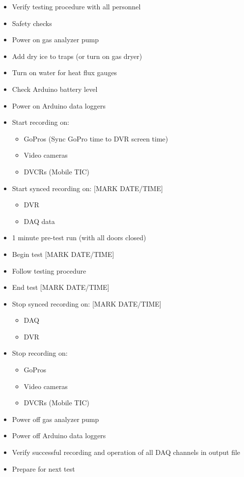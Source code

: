 \documentclass[11pt,oneside]{book}
\begin{document}
\begin{itemize}
\item Verify testing procedure with all personnel
\item Safety checks

\item Power on gas analyzer pump
\item Add dry ice to traps (or turn on gas dryer)

\item Turn on water for heat flux gauges

\item Check Arduino battery level
\item Power on Arduino data loggers

\item Start recording on:
    \begin{itemize}
    \item GoPros (Sync GoPro time to DVR screen time)
    \item Video cameras
    \item DVCRs (Mobile TIC)
    \end{itemize}

\item Start synced recording on: [MARK DATE/TIME]
    \begin{itemize}
    \item DVR
    \item DAQ data
    \end{itemize}

\item 1 minute pre-test run (with all doors closed)

\item Begin test [MARK DATE/TIME]

\item Follow testing procedure

\item End test [MARK DATE/TIME]

\item Stop synced recording on: [MARK DATE/TIME]
    \begin{itemize}
    \item DAQ
    \item DVR
    \end{itemize}

\item Stop recording on:
    \begin{itemize}
    \item GoPros
    \item Video cameras
    \item DVCRs (Mobile TIC)
    \end{itemize}

\item Power off gas analyzer pump

\item Power off Arduino data loggers

\item Verify successful recording and operation of all DAQ channels in output file

\item Prepare for next test
\end{itemize}
\end{document}
